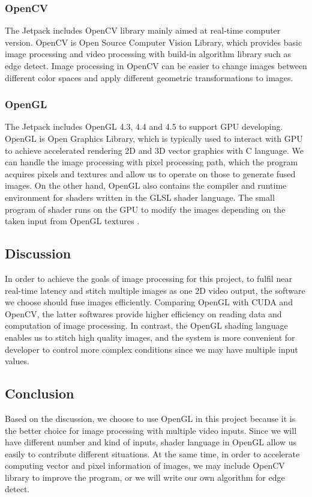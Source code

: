 \documentclass[letterpaper,10pt,serif,draftclsnofoot,onecolumn,compsoc,titlepage]{IEEEtran}
\begin{document}
\subsubsection{OpenCV}
The Jetpack includes OpenCV library mainly aimed at real-time computer version. OpenCV is 
Open Source Computer Vision Library, which provides basic image processing and video 
processing with build-in algorithm library such as edge detect. Image processing in OpenCV 
can be easier to change images between different color spaces and apply different geometric 
transformations to images.\\

\subsubsection{OpenGL}
The Jetpack includes OpenGL 4.3, 4.4 and 4.5 to support GPU developing. OpenGL is Open Graphics Library, 
which is typically used to interact with GPU to achieve accelerated rendering 2D and 3D vector graphics 
with C language. We can handle the image processing with pixel processing path, which the program 
acquires pixels and textures and allow us to operate on those to generate fused images. On the other 
hand, OpenGL also contains the compiler and runtime environment for shaders written in the GLSL shader 
language. The small program of shader runs on the GPU to modify the images depending on the taken input 
from OpenGL textures \cite{shader}.\\ 

\subsection{Discussion}
In order to achieve the goals of image processing for this project, to fulfil near real-time latency and 
stitch multiple images as one 2D video output, the software we choose should fuse images efficiently. 
Comparing OpenGL with CUDA and OpenCV, the latter softwares provide higher efficiency on reading data and 
computation of image processing. In contrast, the OpenGL shading language enables us to stitch high 
quality images, and the system is more convenient for developer to control more complex conditions since 
we may have multiple input values.\\


\subsection{Conclusion}
Based on the discussion, we choose to use OpenGL in this project because it is the better choice for 
image processing with multiple video inputs. Since we will have different number and kind of inputs, 
shader language in OpenGL allow us easily to contribute different situations. At the same time, in order 
to accelerate computing vector and pixel information of images, we may include OpenCV library to improve 
the program, or we will write our own algorithm for edge detect. \\
\end{document}
